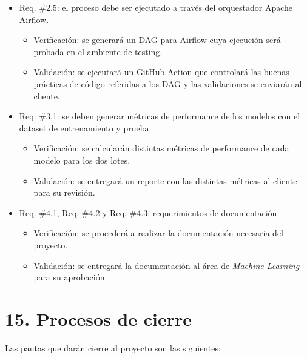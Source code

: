 \documentclass[
11pt, %
]{charter}
\begin{document}
\begin{itemize}
\begin{itemize}
	\end{itemize}
	\item Req. \#2.5: el proceso debe ser ejecutado a través del orquestador Apache Airflow.
	\begin{itemize}
		\item Verificación: se generará un DAG para Airflow cuya ejecución será probada en el ambiente de testing.
		\item Validación: se ejecutará un GitHub Action que controlará las buenas prácticas de código referidas a los DAG y las validaciones se enviarán al cliente.
	\end{itemize}
	\item Req. \#3.1: se deben generar métricas de performance de los modelos con el dataset de entrenamiento y prueba.
	\begin{itemize}
		\item Verificación: se calcularán distintas métricas de performance de cada modelo para los dos lotes.
		\item Validación: se entregará un reporte con las distintas métricas al cliente para su revisión.
	\end{itemize}
	\item Req. \#4.1, Req. \#4.2 y Req. \#4.3: requerimientos de documentación.
	\begin{itemize}
		\item Verificación: se procederá a realizar la documentación necesaria del proyecto.
		\item Validación: se entregará la documentación al área de \textit{Machine Learning} para su aprobación.
	\end{itemize}
\end{itemize}


\section{15. Procesos de cierre}    
\label{sec:cierre}

Las pautas que darán cierre al proyecto son las siguientes:
\end{document}
